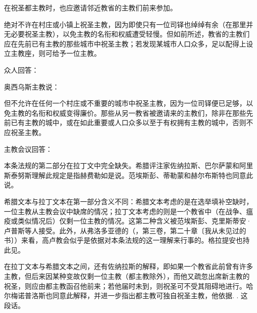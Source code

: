 在祝圣都主教时，也应邀请邻近教省的主教们前来参加。\par

绝对不许在村庄或小镇上祝圣主教，因为即使只有一位司铎也绰绰有余（在那里并无必要祝圣主教），以免主教的名衔和权威遭受轻慢。但如前所述，教省的主教们应在先前已有主教的那些城市中祝圣主教；若发现某城市人口众多，足以配得上设立主教座，则可给予一位主教。\par

众人回答：\par

奥西乌斯主教说：\par

但不允许在任何一个村庄或不重要的城市中祝圣主教，因为一位司铎便已足够，以免主教的名衔和权威变得廉价。那些从另一教省被邀请来的主教们，除非在那些先前已有主教的城中，或在如此重要或人口众多以至于有权拥有主教的城中，否则不应祝圣主教。\par

主教会议回答：\par

本条法规的第二部分在拉丁文中完全缺失。希腊评注家佐纳拉斯、巴尔萨蒙和阿里斯泰努斯理解此规定是指赫费勒如是说。范埃斯彭、蒂勒蒙和赫尔布斯特也同意此说。\par

希腊文本与拉丁文本在第一部分含义不同：希腊文本考虑的是在选举填补空缺时，一位主教从主教会议中缺席的情况；拉丁文本考虑的则是一个教省中（在战争、瘟疫或类似情况后）仅剩一位主教的情况。这第二种含义被范埃斯彭、克里斯蒂安·卢普斯等人接受。此外，从弗洛多亚德的（，第三卷，第二十章〔我从未见过的书〕）来看，高卢教会似乎是依据对本条法规的这一理解来行事的。格拉提安也持此见。\par

在拉丁文本与希腊文本之间，还有佐纳拉斯的解释，即如果一个教省此前曾有许多主教，但后来因某种变故仅剩一位主教（都主教除外），而他又疏忽出席新主教的祝圣，则应由都主教函召他前来；若他届时未到，则祝圣可不受其阻碍地进行。哈尔梅诺普洛斯也同意此解释，并进一步指出都主教可独自祝圣主教，他依据.  . 这段话。\par

